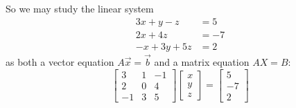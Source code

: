 \begin{applicationActivities}
\begin{observation}
So we may study the linear system
\begin{align*}
3x+y-z &= 5 \\ 2x+4z &= -7 \\ -x+3y+5z &=2
\end{align*}
as both a vector equation \(A\vec{x}=\vec{b}\) and a matrix equation
\(AX=B\):
\[
  \begin{bmatrix} 3 & 1 & -1 \\ 2 & 0 & 4 \\ -1 & 3 & 5  \end{bmatrix}
  \begin{bmatrix} x  \\ y \\ z  \end{bmatrix}
    =
  \begin{bmatrix} 5 \\ -7 \\ 2 \end{bmatrix}
\]
\end{observation}



\end{applicationActivities}
